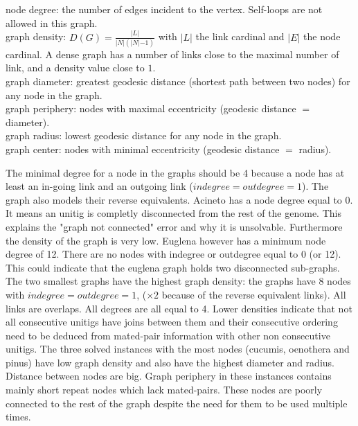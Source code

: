\documentclass[12pt]{article}
\begin{document}
\begin{table}[h!]
{\color{magenta} node degree}: the number of edges incident to the vertex. Self-loops are not allowed in this graph.\\
{\color{magenta} graph density}: $D(G)=\frac{\lvert L \lvert}{\lvert N \lvert(\lvert N \lvert-1)}$ with $\lvert L \lvert$ the link cardinal and $\lvert E \lvert$ the node cardinal. A dense graph has a  number of links close to the maximal number of link, and a density value close to $1$. \\
{\color{magenta} graph diameter}: greatest geodesic distance (shortest path between two nodes) for any node in the graph. \\
{\color{magenta} graph periphery}: nodes with maximal eccentricity (geodesic distance $=$ diameter).\\
{\color{magenta} graph radius}: lowest geodesic distance for any node in the graph.\\
{\color{magenta} graph center}: nodes with minimal eccentricity (geodesic distance $=$ radius).\\
\label{tab:graphcomplexity}
\end{table}

The minimal degree for a node in the graphs should be 4 because a node has at least an in-going link and an outgoing link ($indegree=outdegree=1$). The graph also models their reverse equivalents. Acineto has a node degree equal to 0. It means an unitig is completly disconnected from the rest of the genome. This explains the "graph not connected" error and why it is unsolvable. Furthermore the density of the graph is very low. Euglena however has a minimum node degree of 12. There are no nodes with indegree or outdegree equal to 0 (or 12). This could indicate that the euglena graph holds two disconnected sub-graphs. \\
The two smallest graphs have the highest graph density: the graphs have 8 nodes with $indegree=outdegree=1$, ($\times 2$ because of the reverse equivalent links). All links are overlaps. All degrees are all equal to 4. Lower densities indicate that not all consecutive unitigs have joins between them and their consecutive ordering need to be deduced from mated-pair information with other non consecutive unitigs. The three solved instances with the most nodes (cucumis, oenothera and pinus) have low graph density and also have the highest diameter and radius. Distance between nodes are big. Graph periphery in these instances contains mainly short repeat nodes which lack mated-pairs. These nodes are poorly connected to the rest of the graph despite the need for them to be used multiple times.
\end{document}
